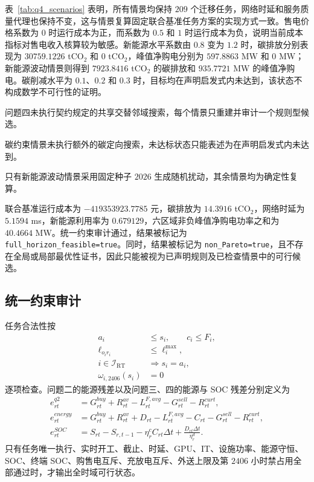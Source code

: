 表~\ref{tab:q4_scenarios} 表明，所有情景均保持 $209$ 个迁移任务，网络时延和服务质量代理也保持不变，这与情景复算固定联合基准任务方案的实现方式一致。售电价格系数为 $0$ 时运行成本为正，而系数为 $0.5$ 和 $1$ 时运行成本为负，说明当前成本指标对售电收入核算较为敏感。新能源水平系数由 $0.8$ 变为 $1.2$ 时，碳排放分别表现为 $30759.1226$ tCO$_2$ 和 $0$ tCO$_2$，峰值净购电分别为 $597.8863$ MW 和 $0$ MW；新能源波动情景则得到 $7923.8416$ tCO$_2$ 的碳排放和 $935.7721$ MW 的峰值净购电。碳削减水平为 $0.1$、$0.2$ 和 $0.3$ 时，目标均在声明启发式内未达到，该状态不构成数学不可行性的证明。

问题四未执行契约规定的共享交替邻域搜索，每个情景只重建并审计一个规则型候选。

碳约束情景未执行额外的碳定向搜索，未达标状态只能表述为在声明启发式内未达到。

只有新能源波动情景采用固定种子 $2026$ 生成随机扰动，其余情景均为确定性复算。

联合基准运行成本为 $-419353923.7785$ 元，碳排放为 $14.3916$ tCO$_2$，网络时延为 $5.1594$ ms，新能源利用率为 $0.679129$，六区域非负峰值净购电功率之和为 $40.4664$ MW。统一约束审计通过，结果被标记为 \texttt{full\_horizon\_feasible=true}。同时，结果被标记为 \texttt{non\_Pareto=true}，且不存在全局或局部最优性证书，因此只能被视为已声明规则及已检查情景中的可行候选。

\subsection{统一约束审计}

任务合法性按
\begin{align}
a_i&\le s_i,\qquad c_i\le F_i,\\
\ell_{o_ir_i}&\le\ell_i^{\max},\\
i\in\mathcal I_{\mathrm{RT}}&\Rightarrow s_i=a_i,\\
\omega_{i,2406}(s_i)&=0
\end{align}
逐项检查。问题二的能源残差以及问题三、四的能源与 SOC 残差分别定义为
\begin{align}
e_{rt}^{q2}
&=G_{rt}^{buy}+R_{rt}^{av}
-L_{rt}^{F,avg}-G_{rt}^{sell}-R_{rt}^{curt},\\
e_{rt}^{energy}
&=G_{rt}^{buy}+R_{rt}^{av}+D_{rt}
-L_{rt}^{F,avg}-C_{rt}-G_{rt}^{sell}-R_{rt}^{curt},\\
e_{rt}^{SOC}
&=S_{rt}-S_{r,t-1}-\eta_r^cC_{rt}\Delta t
+\frac{D_{rt}\Delta t}{\eta_r^d}.
\end{align}
只有任务唯一执行、实时开工、截止、时延、GPU、IT、设施功率、能源守恒、SOC、终端 SOC、购售电互斥、充放电互斥、外送上限及第 $2406$ 小时禁占用全部通过时，才输出全时域可行状态。

